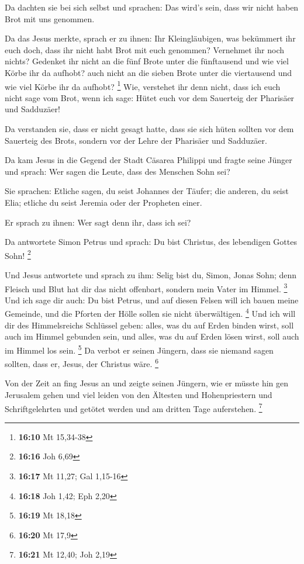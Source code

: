  Da dachten sie bei sich selbst und sprachen: Das wird's
sein, dass wir nicht haben Brot mit uns genommen.

 Da das Jesus merkte, sprach er zu ihnen: Ihr
Kleingläubigen, was bekümmert ihr euch doch, dass ihr nicht habt Brot
mit euch genommen?  Vernehmet ihr noch nichts? Gedenket ihr
nicht an die fünf Brote unter die fünftausend und wie viel Körbe ihr da
aufhobt?  auch nicht an die sieben Brote unter die
viertausend und wie viel Körbe ihr da aufhobt? \footnote{\textbf{16:10}
  Mt 15,34-38}  Wie, verstehet ihr denn nicht, dass ich
euch nicht sage vom Brot, wenn ich sage: Hütet euch vor dem Sauerteig
der Pharisäer und Sadduzäer!

 Da verstanden sie, dass er nicht gesagt hatte, dass sie
sich hüten sollten vor dem Sauerteig des Brots, sondern vor der Lehre
der Pharisäer und Sadduzäer.

 Da kam Jesus in die Gegend der Stadt Cäsarea Philippi und
fragte seine Jünger und sprach: Wer sagen die Leute, dass des Menschen
Sohn sei?

 Sie sprachen: Etliche sagen, du seist Johannes der Täufer;
die anderen, du seist Elia; etliche du seist Jeremia oder der Propheten
einer.

 Er sprach zu ihnen: Wer sagt denn ihr, dass ich sei?

 Da antwortete Simon Petrus und sprach: Du bist Christus,
des lebendigen Gottes Sohn! \footnote{\textbf{16:16} Joh 6,69}

 Und Jesus antwortete und sprach zu ihm: Selig bist du,
Simon, Jonas Sohn; denn Fleisch und Blut hat dir das nicht offenbart,
sondern mein Vater im Himmel. \footnote{\textbf{16:17} Mt 11,27; Gal
  1,15-16}  Und ich sage dir auch: Du bist Petrus, und auf
diesen Felsen will ich bauen meine Gemeinde, und die Pforten der Hölle
sollen sie nicht überwältigen. \footnote{\textbf{16:18} Joh 1,42; Eph
  2,20}  Und ich will dir des Himmelsreichs Schlüssel
geben: alles, was du auf Erden binden wirst, soll auch im Himmel
gebunden sein, und alles, was du auf Erden lösen wirst, soll auch im
Himmel los sein. \footnote{\textbf{16:19} Mt 18,18}  Da
verbot er seinen Jüngern, dass sie niemand sagen sollten, dass er,
Jesus, der Christus wäre. \footnote{\textbf{16:20} Mt 17,9}

 Von der Zeit an fing Jesus an und zeigte seinen Jüngern,
wie er müsste hin gen Jerusalem gehen und viel leiden von den Ältesten
und Hohenpriestern und Schriftgelehrten und getötet werden und am
dritten Tage auferstehen. \footnote{\textbf{16:21} Mt 12,40; Joh 2,19}

